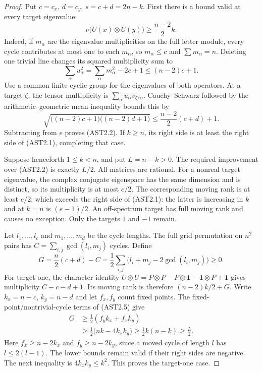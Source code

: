 \begin{proof}
Put $c=c_x$, $d=c_y$, $s=c+d=2n-k$.
First there is a bound valid at every target eigenvalue:
\[
 \nu\bigl(U(x)\otimes U(y)\bigr)
                    \ge\frac{n-2}{2}k.                \tag{AST2.2}
\]
Indeed, if $m_\alpha$ are the eigenvalue multiplicities on the
full letter module, every cycle contributes at most one to each
$m_\alpha$, so $m_\alpha\le c$ and $\sum m_\alpha=n$.
Deleting one trivial line changes its squared multiplicity sum to
\[
 \sum_\alpha u_\alpha^2
   =\sum_\alpha m_\alpha^2-2c+1
   \le(n-2)c+1.                                        \tag{AST2.3}
\]
Use a common finite cyclic group for the eigenvalues of both
operators. At a target $\zeta$, the tensor multiplicity is
$\sum_\alpha u_\alpha v_{\zeta/\alpha}$.
Cauchy--Schwarz followed by the arithmetic--geometric mean inequality
bounds this by
\[
 \sqrt{\big((n-2)c+1\big)\big((n-2)d+1\big)}
            \le\frac{n-2}{2}(c+d)+1.
                                                               \tag{AST2.4}
\]
Subtracting from $e$ proves (AST2.2). If $k\ge n$, its right
side is at least the right side of (AST2.1), completing that case.

Suppose henceforth $1\le k<n$, and put $L=n-k>0$.
The required improvement over (AST2.2) is exactly $L/2$.
All matrices are rational. For a nonreal target eigenvalue, the
complex conjugate eigenspace has the same dimension and is distinct,
so its multiplicity is at most $e/2$. The corresponding moving
rank is at least $e/2$, which exceeds the right side of (AST2.1):
the latter is increasing in $k$ and at $k=n$ is $(e-1)/2$.
An off-spectrum target has full moving rank and causes no exception.
Only the targets $1$ and $-1$ remain.

Let $l_1,\ldots,l_c$ and $m_1,\ldots,m_d$ be the cycle lengths.
The full grid permutation on $n^2$ pairs has
$C=\sum_{i,j}\gcd(l_i,m_j)$ cycles. Define
\[
 G=\frac n2(c+d)-C
   =\frac12\sum_{i,j}
        \bigl(l_i+m_j-2\gcd(l_i,m_j)\bigr)\ge0.
                                                               \tag{AST2.5}
\]
For target one, the character identity
$U\otimes U=P\otimes P-P\otimes\mathbf1
-\mathbf1\otimes P+\mathbf1$ gives multiplicity $C-c-d+1$.
Its moving rank is therefore $(n-2)k/2+G$.
Write $k_x=n-c$, $k_y=n-d$ and let $f_x,f_y$ count fixed points.
The fixed-point/nontrivial-cycle terms of (AST2.5) give
\[
 \begin{split}
 G&\ge\frac12(f_yk_x+f_xk_y)\\
  &\ge\frac12\bigl(nk-4k_xk_y\bigr)
   \ge\frac12k(n-k)\ge\frac L2.
 \end{split}                                             \tag{AST2.6}
\]
Here $f_x\ge n-2k_x$ and $f_y\ge n-2k_y$, since a moved
cycle of length $l$ has $l\le2(l-1)$. The lower bounds remain
valid if their right sides are negative. The next inequality is
$4k_xk_y\le k^2$. This proves the target-one case.


\end{proof}
